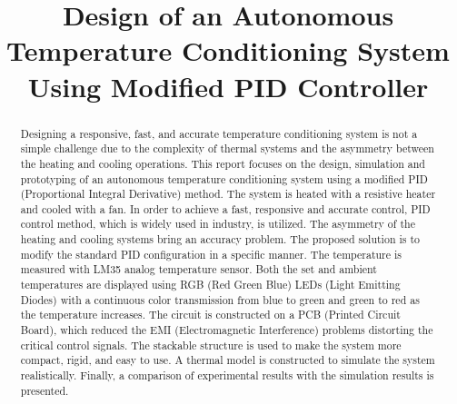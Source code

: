 \documentclass[conference]{IEEEtran}
\begin{document}
\title{Design of an Autonomous Temperature Conditioning System Using Modified PID Controller\\
{}
}

\author{
\and
{}
}

\maketitle

\begin{abstract}
Designing a responsive, fast, and accurate temperature conditioning system is not a simple challenge due to the complexity of thermal systems and the asymmetry between the heating and cooling operations. This report focuses on the design, simulation and prototyping of an autonomous temperature conditioning system using a modified PID (Proportional Integral Derivative) method. The system is heated with a resistive heater and cooled with a fan. In order to achieve a fast, responsive and accurate control, PID control method, which is widely used in industry, is utilized. The asymmetry of the heating and cooling systems bring an accuracy problem. The proposed solution is to modify the standard PID configuration in a specific manner. The temperature is measured with LM35 analog temperature sensor. Both the set and ambient temperatures are displayed using RGB (Red Green Blue) LEDs (Light Emitting Diodes) with a continuous color transmission from blue to green and green to red as the temperature increases. The circuit is constructed on a PCB (Printed Circuit Board), which reduced the EMI (Electromagnetic Interference) problems distorting the critical control signals. The stackable structure is used to make the system more compact, rigid, and easy to use. A thermal model is constructed to simulate the system realistically. Finally, a comparison of experimental results with the simulation results is presented.
\end{abstract}
\end{document}
